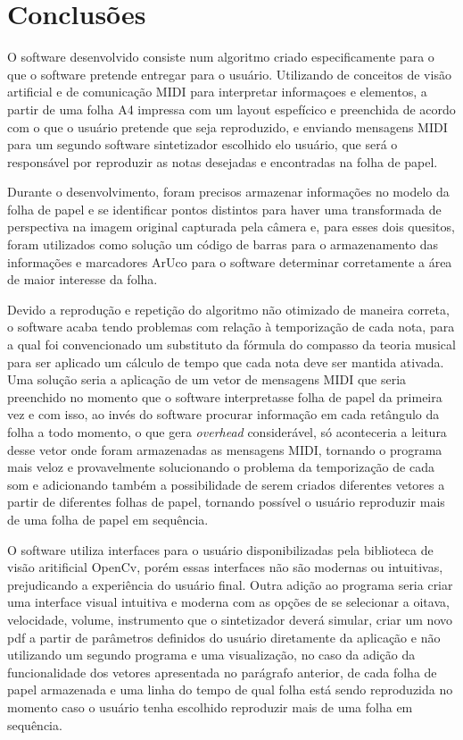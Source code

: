 \documentclass[12pt]{report}
\begin{document}
{\chapter{Conclusões}
\label{cha:conclusoes}

O software desenvolvido consiste num algoritmo criado especificamente para o que o software pretende entregar para o usuário. Utilizando de conceitos de visão artificial e de comunicação MIDI para interpretar informaçoes e elementos, a partir de uma folha A4 impressa com um layout espefícico e preenchida de acordo com o que o usuário pretende que seja reproduzido, e enviando mensagens MIDI para um segundo software sintetizador escolhido elo usuário, que será o responsável por reproduzir as notas desejadas e encontradas na folha de papel.

Durante o desenvolvimento, foram precisos armazenar informações no modelo da folha de papel e se identificar pontos distintos para haver uma transformada de perspectiva na imagem original capturada pela câmera e, para esses dois quesitos, foram utilizados como solução um código de barras para o armazenamento das informações e marcadores ArUco para o software determinar corretamente a área de maior interesse da folha.

Devido a reprodução e repetição do algoritmo não otimizado de maneira correta, o software acaba tendo problemas com relação à temporização de cada nota, para a qual foi convencionado um substituto da fórmula do compasso da teoria musical para ser aplicado um cálculo de tempo que cada nota deve ser mantida ativada. Uma solução seria a aplicação de um vetor de mensagens MIDI que seria preenchido no momento que o software interpretasse folha de papel da primeira vez e com isso, ao invés do software procurar informação em cada retângulo da folha a todo momento, o que gera {\it overhead} considerável, só aconteceria a leitura desse vetor onde foram armazenadas as mensagens MIDI, tornando o programa mais veloz e provavelmente solucionando o problema da temporização de cada som e adicionando também a possibilidade de serem criados diferentes vetores a partir de diferentes folhas de papel, tornando possível o usuário reproduzir mais de uma folha de papel em sequência.

O software utiliza interfaces para o usuário disponibilizadas pela biblioteca de visão aritificial OpenCv, porém essas interfaces não são modernas ou intuitivas, prejudicando a experiência do usuário final. Outra adição ao programa seria criar uma interface visual intuitiva e moderna com as opções de se selecionar a oitava, velocidade, volume, instrumento que o sintetizador deverá simular, criar um novo pdf a partir de parâmetros definidos do usuário diretamente da aplicação e não utilizando um segundo programa e uma visualização, no caso da adição da funcionalidade dos vetores apresentada no parágrafo anterior, de cada folha de papel armazenada e uma linha do tempo de qual folha está sendo reproduzida no momento caso o usuário tenha escolhido reproduzir mais de uma folha em sequência.


}
\end{document}
